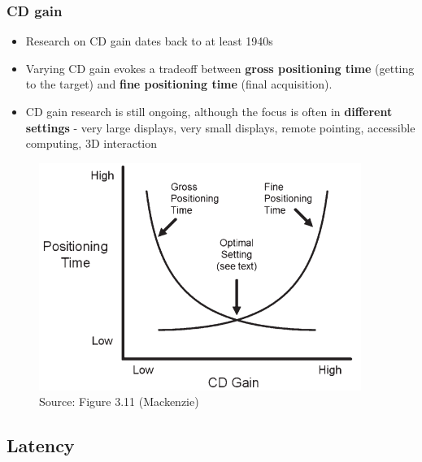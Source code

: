 \documentclass{beamer}
\begin{document}
\begin{frame}
	\frametitle{CD gain}
	\begin{itemize}
		\item Research on CD gain dates back to at least 1940s
		\item Varying CD gain evokes a tradeoff between \textbf{gross positioning time} (getting to the target) and \textbf{fine positioning time} (final acquisition).
		\item  CD gain research is still ongoing, although the focus is often in \textbf{different settings} - very large displays, very small displays, remote pointing, accessible computing, 3D interaction

	\end{itemize}
	\begin{figure}
		\includegraphics[width=0.35\linewidth]{image/3-11}
		\caption{Source: Figure 3.11 (Mackenzie)}
	\end{figure}
\end{frame}


\subsection{Latency}
\end{document}
